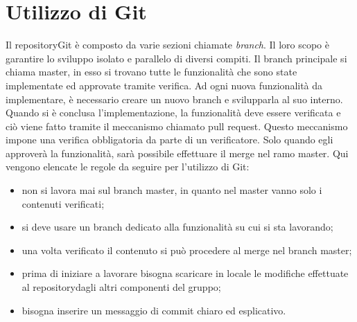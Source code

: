 \section{Utilizzo di Git}
Il repository\glosp Git è composto da varie sezioni chiamate \textit{branch}. Il loro scopo è garantire lo sviluppo isolato e parallelo di diversi compiti. Il branch principale si chiama master, in esso si trovano tutte le funzionalità che sono state implementate ed approvate tramite verifica. Ad ogni nuova funzionalità da implementare, è necessario creare un nuovo branch e svilupparla al suo interno. Quando si è conclusa l'implementazione, la funzionalità deve essere verificata e ciò viene fatto tramite il meccanismo chiamato pull request. Questo meccanismo impone una verifica obbligatoria da parte di un verificatore. Solo quando egli approverà la funzionalità, sarà possibile effettuare il merge nel ramo master.
Qui vengono elencate le regole da seguire per l'utilizzo di Git:
\begin{itemize}
	\item non si lavora mai sul branch master, in quanto nel master vanno solo i contenuti verificati;
	\item si deve usare un branch dedicato alla funzionalità su cui si sta lavorando;
	\item una volta verificato il contenuto si può procedere al merge nel branch master;
	\item prima di iniziare a lavorare bisogna scaricare in locale le modifiche effettuate al repository\glosp dagli altri componenti del gruppo;
	\item bisogna inserire un messaggio di commit chiaro ed esplicativo.
\end{itemize}